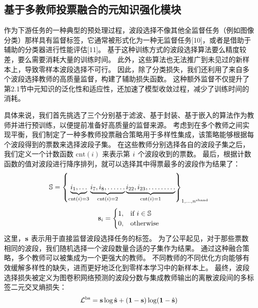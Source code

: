\subsection{基于多教师投票融合的元知识强化模块}
作为下游任务的一种典型的预处理过程，波段选择不像其他全监督任务（例如图像分类）那样具有监督标签，它通常被形式化为一种无监督任务[10]，或者是借助于辅助的分类器进行性能评估[11]。
基于这种训练方式的波段选择算法要么精度较差，要么需要消耗大量的训练时间。
此外，这些算法也无法推广到未见过的新样本上，导致零样本波段选择不可行。
因此，除了分类损失，我们还利用了来自多个波段选择教师的高质量监督，构建了辅助损失函数。
这种额外监督不仅提升了第2.1节中元知识的泛化性和适应性，还加速了模型收敛过程，减少了训练时间的消耗。
\par
具体来说，我们首先挑选了三个分别基于滤波、基于封装、基于嵌入的算法作为教师并进行预训练，以便提前准备好高质量的监督来源。
考虑到在多个教师之间实现平衡，我们制定了一种多教师投票融合策略用于多样性集成，该策略能够根据每个波段得到的票数来选择波段子集。
在这些教师分别选择各自的波段子集之后，我们定义一个计数函数 $\text{cnt}(i)$ 来表示第 $i$ 个波段收到的票数。
最后，根据计数函数的值对波段进行降序排列，就可以选择其中得票最多的波段作为结果了：
\begin{equation}
    \mathbb{S} = \left\{ \underbrace{i_1, \dots}_{\text{cnt}(i) = 3} \underbrace{i_7, i_8, \dots \dots}_{\text{cnt}(i) = 2} \underbrace{i_{22}, i_{23}, \dots \dots \dots}_{\text{cnt}(i) = 1} \right\} _{1, \dots, n^\text{sband}}
    \label{eqn:divens-set}
\end{equation}
\begin{equation}
    \mathbf{s}_i =
    \begin{cases}
        1,&\text{if } i \in \mathbb{S} \\
        0,&\text{otherwise}
    \end{cases}
    \label{eqn:divens}
\end{equation}
这里，$\mathbf{s}$ 表示用于直接监督波段选择任务的标签。
为了公平起见，对于那些票数相同的波段，我们随机选择一个波段数量合适的子集作为结果。
通过这种融合策略，多个教师可以被集成为一个更强大的教师。
不同教师的不同优化方向能够有效缓解多样性的缺失，进而更好地泛化到零样本学习中的新样本上。
最终，波段选择损失被定义为图卷积网络预测的波段分数与集成教师输出的离散波段间的多标签二元交叉熵损失：
\begin{equation}
    \mathcal{L}^\text{bs} = \mathbf{s} \log\hat{\mathbf{s}} + (\mathbf{1} - \mathbf{s}) \log( \mathbf{1} - \hat{\mathbf{s}} )
    \label{eqn:loss-bs}
\end{equation}
